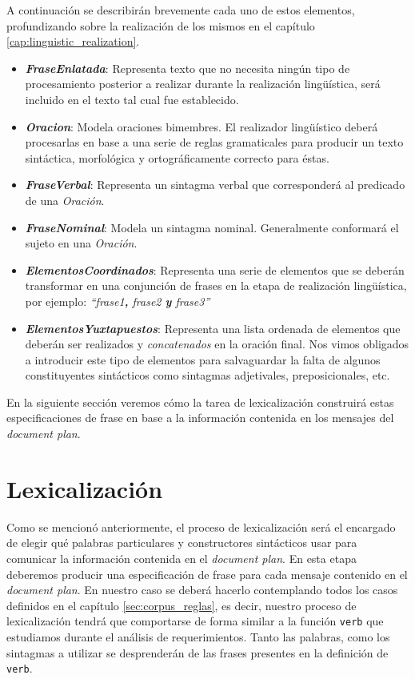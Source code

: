 A continuación se describirán brevemente cada uno de estos elementos, profundizando sobre la realización de los mismos en el capítulo \ref{cap:linguistic_realization}.


\medskip
\begin{itemize}
\item{\emph{\textbf{FraseEnlatada}}: Representa texto que no necesita ningún tipo de procesamiento posterior a realizar durante la realización lingüística, será incluido en el texto tal cual fue establecido.}
\item{\emph{\textbf{Oracion}}: Modela oraciones bimembres. El realizador lingüístico deberá procesarlas en base a una serie de reglas gramaticales para producir un texto sintáctica, morfológica y ortográficamente correcto para éstas.}
\item{\emph{\textbf{FraseVerbal}}: Representa un sintagma verbal que corresponderá al predicado de una \emph{Oración}.}
\item{\emph{\textbf{FraseNominal}}: Modela un sintagma nominal. Generalmente conformará el sujeto en una \emph{Oración}.}
\item{\emph{\textbf{ElementosCoordinados}}: Representa una serie de elementos que se deberán transformar en una conjunción de frases en la etapa de realización lingüística, por ejemplo: \emph{``frase1\textbf{,} frase2 \textbf{y} frase3''}}
\item{\emph{\textbf{ElementosYuxtapuestos}}: Representa una lista ordenada de elementos que deberán ser realizados y \emph{concatenados} en la oración final. Nos vimos obligados a introducir este tipo de elementos para salvaguardar la falta de algunos constituyentes sintácticos como sintagmas adjetivales, preposicionales, etc.}
\end{itemize}

\bigskip
En la siguiente sección veremos cómo la tarea de lexicalización construirá estas especificaciones de frase en base a la información contenida en los mensajes del \textit{document plan}.

\section{Lexicalización}
\label{sec:microplanning_lexicalization}

Como se mencionó anteriormente, el proceso de lexicalización será el encargado de elegir qué palabras particulares y constructores sintácticos usar para comunicar la información contenida en el \textit{document plan}. En esta etapa deberemos producir una especificación de frase para cada mensaje contenido en el \textit{document plan}. En nuestro caso se deberá hacerlo contemplando todos los casos definidos en el capítulo \ref{sec:corpus_reglas}, es decir, nuestro proceso de lexicalización tendrá que comportarse de forma similar a la función \texttt{verb} que estudiamos durante el análisis de requerimientos. Tanto las palabras, como los sintagmas a utilizar se desprenderán de las frases presentes en la definición de \texttt{verb}.

